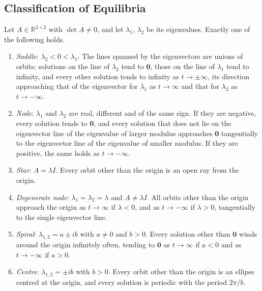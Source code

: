 \subsection{Classification of Equilibria}

\begin{theorem}
\label{thm:phase-classification}
Let $A\in\mathbb R^{2\times2}$ with $\det A\ne0$, and let $\lambda_1$, $\lambda_2$ be its eigenvalues. Exactly one of the following holds.
\begin{enumerate}
\item \emph{Saddle}: $\lambda_2<0<\lambda_1$. The lines spanned by the eigenvectors are unions of orbits; solutions on the line of $\lambda_2$ tend to $\mathbf 0$, those on the line of $\lambda_1$ tend to infinity, and every other solution tends to infinity as $t\to\pm\infty$, its direction approaching that of the eigenvector for $\lambda_1$ as $t\to\infty$ and that for $\lambda_2$ as $t\to-\infty$.
\item \emph{Node}: $\lambda_1$ and $\lambda_2$ are real, different and of the same sign. If they are negative, every solution tends to $\mathbf 0$, and every solution that does not lie on the eigenvector line of the eigenvalue of larger modulus approaches $\mathbf 0$ tangentially to the eigenvector line of the eigenvalue of smaller modulus. If they are positive, the same holds as $t\to-\infty$.
\item \emph{Star}: $A=\lambda I$. Every orbit other than the origin is an open ray from the origin.
\item \emph{Degenerate node}: $\lambda_1=\lambda_2=\lambda$ and $A\ne\lambda I$. All orbits other than the origin approach the origin as $t\to\infty$ if $\lambda<0$, and as $t\to-\infty$ if $\lambda>0$, tangentially to the single eigenvector line.
\item \emph{Spiral}: $\lambda_{1,2}=a\pm ib$ with $a\ne0$ and $b>0$. Every solution other than $\mathbf 0$ winds around the origin infinitely often, tending to $\mathbf 0$ as $t\to\infty$ if $a<0$ and as $t\to-\infty$ if $a>0$.
\item \emph{Centre}: $\lambda_{1,2}=\pm ib$ with $b>0$. Every orbit other than the origin is an ellipse centred at the origin, and every solution is periodic with the period $2\pi/b$.
\end{enumerate}
\end{theorem}

